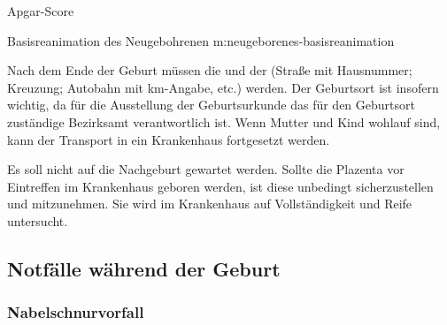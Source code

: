 {}
{}
{}
{}
{Apgar-Score}
{}


{Basisreanimation des Neugebohrenen}
{m:neugeborenes-basisreanimation}
{
}{}



Nach dem Ende der Geburt müssen die  und der
 (Straße mit Hausnummer; Kreuzung; Autobahn
mit km-Angabe, etc.)  werden. Der
Geburtsort ist insofern wichtig, da für die Ausstellung der
Geburtsurkunde  das für den Geburtsort zuständige Bezirksamt
verantwortlich ist. Wenn Mutter und Kind wohlauf sind, kann
der Transport in ein Krankenhaus fortgesetzt werden.

Es soll nicht auf die Nachgeburt gewartet werden. Sollte die
Plazenta vor Eintreffen im Krankenhaus geboren werden, ist
diese unbedingt sicherzustellen und mitzunehmen. Sie wird im
Krankenhaus auf Vollständigkeit und Reife untersucht.



\subsection{Notfälle während der Geburt}
\label{topic:notfall-geburt}

\subsubsection{Nabelschnurvorfall}

